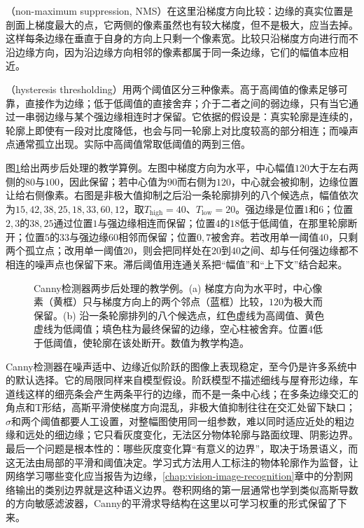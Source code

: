 （non-maximum suppression, NMS）在这里沿梯度方向比较：边缘的真实位置是剖面上梯度最大的点，它两侧的像素虽然也有较大梯度，但不是极大，应当去掉。这样每条边缘在垂直于自身的方向上只剩一个像素宽。比较只沿梯度方向进行而不沿边缘方向，因为沿边缘方向相邻的像素都属于同一条边缘，它们的幅值本应相近。

（hysteresis thresholding）用两个阈值区分三种像素。高于高阈值的像素足够可靠，直接作为边缘；低于低阈值的直接舍弃；介于二者之间的弱边缘，只有当它通过一串弱边缘与某个强边缘相连时才保留。它依据的假设是：真实轮廓是连续的，轮廓上即使有一段对比度降低，也会与同一轮廓上对比度较高的部分相连；而噪声点通常孤立出现。实际中高阈值常取低阈值的两到三倍。

图\ref{fig:vision-features-canny-steps}给出两步后处理的教学算例。左图中梯度方向为水平，中心幅值$120$大于左右两侧的$80$与$100$，因此保留；若中心值为$90$而右侧为$120$，中心就会被抑制，边缘位置让给右侧像素。右图是非极大值抑制之后沿一条轮廓排列的八个候选点，幅值依次为$15,42,38,25,18,33,60,12$，取$T_{\mathrm{high}}=40$、$T_{\mathrm{low}}=20$。强边缘是位置$1$和$6$；位置$2,3$的$38,25$通过位置$1$与强边缘相连而保留；位置$4$的$18$低于低阈值，在那里轮廓断开；位置$5$的$33$与强边缘$60$相邻而保留；位置$0,7$被舍弃。若改用单一阈值$40$，只剩两个孤立点；改用单一阈值$20$，则会把同样处在$20$到$40$之间、却与任何强边缘都不相连的噪声点也保留下来。滞后阈值用连通关系把“幅值”和“上下文”结合起来。

\begin{figure}[htbp]
  \centering
  
  \caption{Canny检测器两步后处理的教学例。(a) 梯度方向为水平时，中心像素（黄框）只与梯度方向上的两个邻点（蓝框）比较，$120$为极大而保留。(b) 沿一条轮廓排列的八个候选点，红色虚线为高阈值、黄色虚线为低阈值；填色柱为最终保留的边缘，空心柱被舍弃。位置$4$低于低阈值，使轮廓在该处断开。数值为教学构造。}
  \label{fig:vision-features-canny-steps}
\end{figure}

Canny检测器在噪声适中、边缘近似阶跃的图像上表现稳定，至今仍是许多系统中的默认选择。它的局限同样来自模型假设。阶跃模型不描述细线与屋脊形边缘，车道线这样的细亮条会产生两条平行的边缘，而不是一条中心线；在多条边缘交汇的角点和T形结，高斯平滑使梯度方向混乱，非极大值抑制往往在交汇处留下缺口；$\sigma$和两个阈值都要人工设置，对整幅图使用同一组参数，难以同时适应近处的粗边缘和远处的细边缘；它只看灰度变化，无法区分物体轮廓与路面纹理、阴影边界。最后一个问题是根本性的：哪些灰度变化算“有意义的边界”，取决于场景语义，而这无法由局部的平滑和阈值决定。学习式方法用人工标注的物体轮廓作为监督，让网络学习哪些变化应当报告为边缘，\ref{chap:vision-image-recognition}章中的分割网络输出的类别边界就是这种语义边界。卷积网络的第一层通常也学到类似高斯导数的方向敏感滤波器，Canny的平滑求导结构在这里以可学习权重的形式保留了下来。

